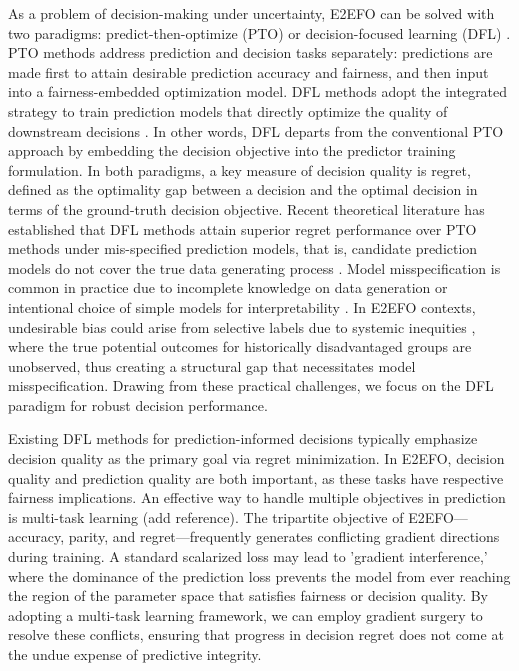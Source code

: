 \documentclass[ijoc,sglanonrev]{informs4}
\begin{document}
As a problem of decision-making under uncertainty, E2EFO can be solved with two paradigms: predict-then-optimize (PTO) or decision-focused learning (DFL) \citep{kotary2021}. PTO methods address prediction and decision tasks separately: predictions are made first to attain desirable prediction accuracy and fairness, and then input into a fairness-embedded optimization model. DFL methods adopt the integrated strategy to train prediction models that directly optimize the quality of downstream decisions \citep{donti2017task,wilder2019melding,spo2020}. In other words, DFL departs from the conventional PTO approach by embedding the decision objective into the predictor training formulation. In both paradigms, a key measure of decision quality is regret, defined as the optimality gap between a decision and the optimal decision in terms of the ground-truth decision objective. Recent theoretical literature has established that DFL methods attain superior regret performance over PTO methods under mis-specified prediction models, that is, candidate prediction models do not cover the true data generating process \citep{elmachtoub2023estimate,elmachtoubdissecting}. Model misspecification is common in practice due to incomplete knowledge on data generation \cite{bennouna2025contextual} or intentional choice of simple models for interpretability \cite{fudenberg2026complexity}. In E2EFO contexts, undesirable bias could arise from selective labels due to systemic inequities \cite{lakkaraju2017selective}, where the true potential outcomes for historically disadvantaged groups are unobserved, thus creating a structural gap that necessitates model misspecification. Drawing from these practical challenges, we focus on the DFL paradigm for robust decision performance. 

Existing DFL methods for prediction-informed decisions typically emphasize decision quality as the primary goal via regret minimization. In E2EFO, decision quality and prediction quality are both important, as these tasks have respective fairness implications. An effective way to handle multiple objectives in prediction is multi-task learning (add reference). The tripartite objective of E2EFO—accuracy, parity, and regret—frequently generates conflicting gradient directions during training. A standard scalarized loss may lead to 'gradient interference,' where the dominance of the prediction loss prevents the model from ever reaching the region of the parameter space that satisfies fairness or decision quality. By adopting a multi-task learning framework, we can employ gradient surgery to resolve these conflicts, ensuring that progress in decision regret does not come at the undue expense of predictive integrity.
\end{document}
